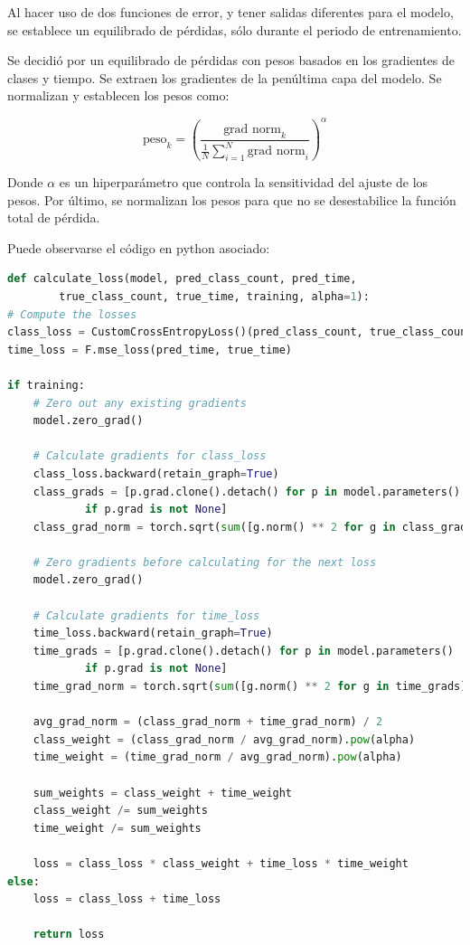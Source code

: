 Al hacer uso de dos funciones de error, y tener salidas diferentes para el modelo, se establece un equilibrado de pérdidas, sólo durante el periodo de entrenamiento.

Se decidió por un equilibrado de pérdidas con pesos basados en los gradientes de clases y tiempo. Se extraen los gradientes de la penúltima capa del modelo. Se normalizan y establecen los pesos como: 

$$
\text{peso}_k={(\frac{\text{grad norm}_k}{\frac{1}{N}\sum_{i=1}^{N}\text{grad norm}_i})}^\alpha
$$

Donde $\alpha$ es un hiperparámetro que controla la sensitividad del ajuste de los pesos.
Por último, se normalizan los pesos para que no se desestabilice la función total de pérdida.

Puede observarse el código en python asociado:
\begin{lstlisting}[language=python]
def calculate_loss(model, pred_class_count, pred_time, 
        true_class_count, true_time, training, alpha=1):
# Compute the losses
class_loss = CustomCrossEntropyLoss()(pred_class_count, true_class_count)
time_loss = F.mse_loss(pred_time, true_time)

if training:
    # Zero out any existing gradients
    model.zero_grad()

    # Calculate gradients for class_loss
    class_loss.backward(retain_graph=True)
    class_grads = [p.grad.clone().detach() for p in model.parameters()
            if p.grad is not None]
    class_grad_norm = torch.sqrt(sum([g.norm() ** 2 for g in class_grads]))

    # Zero gradients before calculating for the next loss
    model.zero_grad()

    # Calculate gradients for time_loss
    time_loss.backward(retain_graph=True)
    time_grads = [p.grad.clone().detach() for p in model.parameters() 
            if p.grad is not None]
    time_grad_norm = torch.sqrt(sum([g.norm() ** 2 for g in time_grads]))

    avg_grad_norm = (class_grad_norm + time_grad_norm) / 2
    class_weight = (class_grad_norm / avg_grad_norm).pow(alpha)
    time_weight = (time_grad_norm / avg_grad_norm).pow(alpha)

    sum_weights = class_weight + time_weight
    class_weight /= sum_weights
    time_weight /= sum_weights

    loss = class_loss * class_weight + time_loss * time_weight
else:
    loss = class_loss + time_loss

    return loss
\end{lstlisting}

